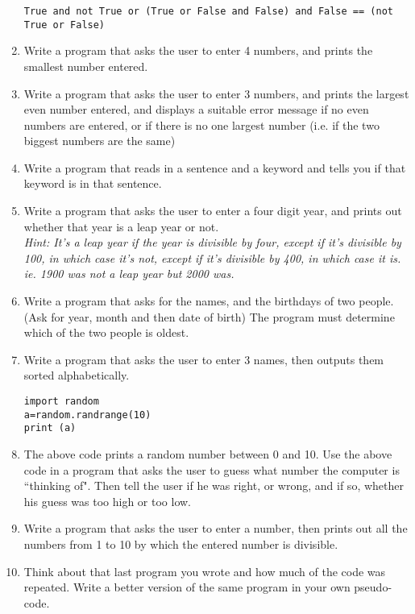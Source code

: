 \begin{enumerate}
\begin{lstlisting}
True and not True or (True or False and False) and False == (not True or False)
\end{lstlisting}
	\item Write a program that asks the user to enter 4 numbers, and
			prints the smallest number entered.
	\item Write a program that asks the user to enter 3 numbers, and
			prints the largest even number entered, and displays a suitable error message if no even numbers are entered, or if there is no one largest number (i.e. if the two biggest numbers are the same)
	\item Write a program that reads in a sentence and a keyword and tells you if that keyword is in that sentence.
	\item Write a program that asks the user to enter a four digit year,
			and prints out whether that year is a leap year or not. \\
\textit{Hint: It's a leap year if the year is divisible by four, except if it's divisible by 100, in which case it's not, except if it's divisible by 400, in which case it is. ie. 1900 was not a leap year but 2000 was.}
	\item Write a program that asks for the names, and the birthdays of two people. (Ask for year, month and then date of birth) The program must determine which of the two people is oldest.
	\item Write a program that asks the user to enter 3 names, then
			outputs them sorted alphabetically.
	
\begin{lstlisting}
import random
a=random.randrange(10)
print (a)
\end{lstlisting} 
\item The above code prints a random number between 0 and 10. Use the above code in a program that asks the user to guess what number the computer is ``thinking of". Then tell the user if he was right, or wrong, and if so, whether his guess was too high or too low.
	\item Write a program that asks the user to enter a number, then
			prints out all the numbers from 1 to 10 by which the entered number
			is divisible.
	\item Think about that last program you wrote and how much of the code was repeated. Write a better version of the same program in your own pseudo-code.

		
\end{enumerate}    
